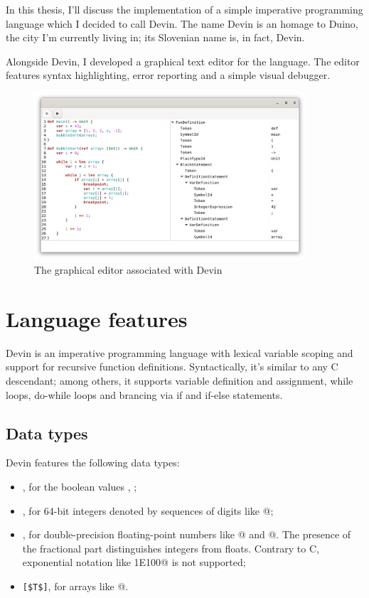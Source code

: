 \documentclass[UdineBachThesis,american,11pt]{PhdThesis}
\begin{document}
  In this thesis, I'll discuss the implementation of a simple imperative
  programming language which I decided to call Devin. The name Devin is an
  homage to Duino, the city I'm currently living in; its Slovenian name is, in
  fact, Devin.

  Alongside Devin, I developed a graphical text editor for the language. The
  editor features syntax highlighting, error reporting and a simple visual
  debugger.

  \begin{figure}[h]
    \centering
    \includegraphics[width=0.9\textwidth]{2.png}
    \caption{The graphical editor associated with Devin}
  \end{figure}

  \section{Language features}

  Devin is an imperative programming language with lexical variable scoping and
  support for recursive function definitions. Syntactically, it's similar to any
  C descendant; among others, it supports variable definition and assignment,
  while loops, do-while loops and brancing via if and if-else statements.

  \subsection{Data types}

  Devin features the following data types:

  \begin{itemize}
    \item \lstinline@Bool@, for the boolean values \lstinline@true@,
    \lstinline@false@;

    \item \lstinline@Int@, for 64-bit integers denoted by sequences of digits
    like @;

    \item \lstinline@Float@, for double-precision floating-point numbers like
    @ and @. The presence of the fractional part
    distinguishes integers from floats. Contrary to C, exponential notation like
    \lstinline@1E100@ is not supported;

    \item \lstinline[mathescape]@[$T$]@, for arrays like
    \lstinline@[1, 1, 2, 3, 5, 8, 13, 21, 34, 55]@.
  \end{itemize}
\end{document}
